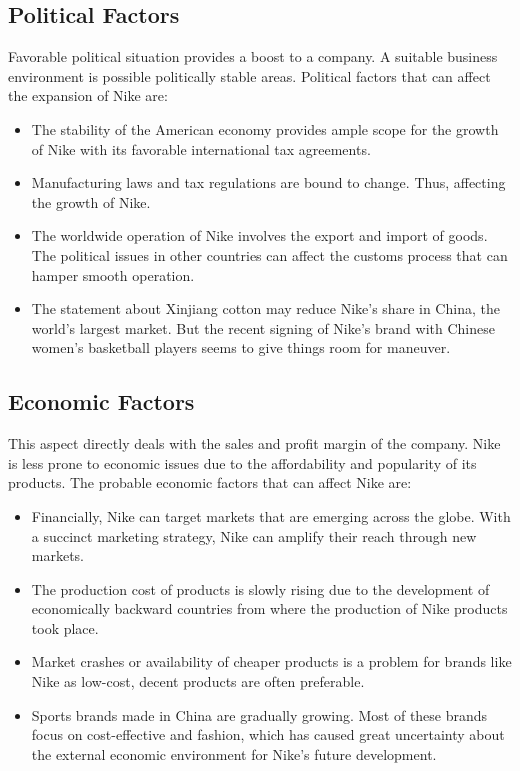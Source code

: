 \documentclass[a4paper, 12pt]{report}
\begin{document}
\subsection{Political Factors}
Favorable political situation provides a boost to a company. A suitable business environment is possible politically stable areas. Political factors that can affect the expansion of Nike are:
\begin{itemize}
    \item The stability of the American economy provides ample scope for the growth of Nike with its favorable international tax agreements.
    \item Manufacturing laws and tax regulations are bound to change. Thus, affecting the growth of Nike.
    \item The worldwide operation of Nike involves the export and import of goods. The political issues in other countries can affect the customs process that can hamper smooth operation.
    \item The statement about Xinjiang cotton may reduce Nike's share in China, the world's largest market. But the recent signing of Nike's brand with Chinese women's basketball players seems to give things room for maneuver.
\end{itemize}
\subsection{Economic Factors}
This aspect directly deals with the sales and profit margin of the company. Nike is less prone to economic issues due to the affordability and popularity of its products. The probable economic factors that can affect Nike are:
\begin{itemize}
    \item Financially, Nike can target markets that are emerging across the globe. With a succinct marketing strategy, Nike can amplify their reach through new markets.
    \item The production cost of products is slowly rising due to the development of economically backward countries from where the production of Nike products took place.
    \item Market crashes or availability of cheaper products is a problem for brands like Nike as low-cost, decent products are often preferable.
    \item Sports brands made in China are gradually growing. Most of these brands focus on cost-effective and fashion, which has caused great uncertainty about the external economic environment for Nike's future development.
\end{itemize}
\end{document}
